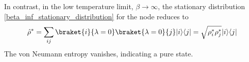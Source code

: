 \begin{comment}
In contrast, in the low temperature limit, $\beta \rightarrow \infty$, the damping coefficient are
\begin{equation}
    \begin{split}
        \gamma_{ij;kl}&= \sum_{\lambda\mu}e^{-\frac{\beta}{2}\left(\epsilon_\lambda - \epsilon_\mu\right)}\braket{i}{\lambda}\braket{\lambda}{k}\braket{l}{\mu}\braket{\mu}{j}\Theta(\lambda-\mu)\\
        & + \sum_{\lambda\mu} 1\braket{i}{\lambda}\braket{\lambda}{k}\braket{l}{\mu}\braket{\mu}{j}\delta_{\lambda\mu}\\
        & + \sum_{\lambda\mu} e^{-\frac{\beta}{2}\left(\epsilon_\lambda - \epsilon_\mu\right)}\braket{i}{\lambda}\braket{\lambda}{k}\braket{l}{\mu}\braket{\mu}{j}\Theta(\mu-\lambda)
    \end{split}
\end{equation}
The first term cancel out,  and the second is a sum of Kronecker delta. Thus, it reduces to
\begin{equation}\label{gamma_T=0}
    \begin{split}
        \gamma_{ij;kl}&= \sum_{\lambda}\braket{i}{\lambda}\braket{\lambda}{k}\braket{l}{\lambda}\braket{\lambda}{j}+ \sum_{\mu>\lambda}\infty\braket{i}{\lambda}\braket{\lambda}{k}\braket{l}{\mu}\braket{\mu}{j} \rightarrow \infty
    \end{split}
\end{equation}
\end{comment}
In contrast, in the low temperature limit, $\beta \rightarrow \infty$, the stationary distribution \eqref{beta_inf_stationary_distribution} for the node reduces to
\begin{equation}
    \hat\rho^* = \sum_{ij} \braket{i}{\lambda = 0}\braket{\lambda = 0}{j} \ket{i}\bra{j} = \sqrt{\rho^*_i\rho^*_j} \ket{i}\bra{j}
\end{equation}
The von Neumann entropy vanishes, indicating a pure state. 




